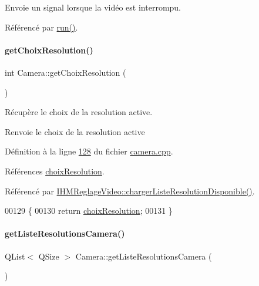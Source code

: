 Envoie un signal lorsque la vidéo est interrompu. 



Référencé par \hyperlink{camera_8cpp_source_l00068}{run()}.

\mbox{\label{class_camera_ab9f05b05c29416dce6471b5a03db98ea}} 
\paragraph{\texorpdfstring{get\+Choix\+Resolution()}{getChoixResolution()}}
{\footnotesize\ttfamily int Camera\+::get\+Choix\+Resolution (\begin{DoxyParamCaption}{ }\end{DoxyParamCaption})}



Récupère le choix de la resolution active. 

\begin{DoxyReturn}{Renvoie}
le choix de la resolution active 
\end{DoxyReturn}


Définition à la ligne \hyperlink{camera_8cpp_source_l00128}{128} du fichier \hyperlink{camera_8cpp_source}{camera.\+cpp}.



Références \hyperlink{camera_8h_source_l00072}{choix\+Resolution}.



Référencé par \hyperlink{ihmreglagevideo_8cpp_source_l00179}{I\+H\+M\+Reglage\+Video\+::charger\+Liste\+Resolution\+Disponible()}.


\begin{DoxyCode}
00129 \{
00130     \textcolor{keywordflow}{return} \hyperlink{class_camera_a3fdddf6f548f04d7bdc26f32602a03d4}{choixResolution};
00131 \}
\end{DoxyCode}
\mbox{\label{class_camera_a997441a0c1e33fe3eda800953548071d}} 
\paragraph{\texorpdfstring{get\+Liste\+Resolutions\+Camera()}{getListeResolutionsCamera()}}
{\footnotesize\ttfamily Q\+List$<$ Q\+Size $>$ Camera\+::get\+Liste\+Resolutions\+Camera (\begin{DoxyParamCaption}{ }\end{DoxyParamCaption})}



